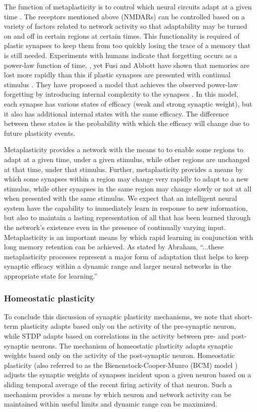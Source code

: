 \documentclass[twocolumn]{article}
\begin{document}
The function of metaplasticity is to control which neural circuits adapt at a given time \cite{ab2008}. The receptors mentioned above (NMDARs) can be controlled based on a variety of factors related to network activity so that adaptability may be turned on and off in certain regions at certain times. This functionality is required of plastic synapses to keep them from too quickly losing the trace of a memory that is still needed. Experiments with humans indicate that forgetting occurs as a power-law function of time, \cite{wieb1991,wieb1997}, yet Fusi and Abbott have shown that memories are lost more rapidly than this if plastic synapses are presented with continual stimulus \cite{fuab2007}. They have proposed a model that achieves the observed power-law forgetting by introducing internal complexity to the synapses \cite{fudr2005}. In this model, each synapse has various states of efficacy (weak and strong synaptic weight), but it also has additional internal states with the same efficacy. The difference between these states is the probability with which the efficacy will change due to future plasticity events. 

Metaplasticity provides a network with the means to to enable some regions to adapt at a given time, under a given stimulus, while other regions are unchanged at that time, under that stimulus. Further, metaplasticity provides a means by which some synapses within a region may change very rapidly to adapt to a new stimulus, while other synapses in the same region may change slowly or not at all when presented with the same stimulus. We expect that an intelligent neural system have the capability to immediately learn in response to new information, but also to maintain a lasting representation of all that has been learned through the network's existence even in the presence of continually varying input. Metaplasticity is an important means by which rapid learning in conjunction with long memory retention can be achieved. As stated by Abraham, ``...these metaplasticity processes represent a major form of adaptation that helps to keep synaptic efficacy within a dynamic range and larger neural networks in the appropriate state for learning.''

\subsubsection{Homeostatic plasticity}
To conclude this discussion of synaptic plasticity mechanisms, we note that short-term plasticity adapts based only on the activity of the pre-synaptic neuron, while STDP adapts based on correlations in the activity between pre- and post-synaptic neurons. The mechanism of homeostatic plasticity \cite{cube2012} adapts synaptic weights based only on the activity of the post-synaptic neuron. Homeostatic plasticity (also referred to as the Bienenstock-Cooper-Munro (BCM) model \cite{bico1982}) adjusts the synaptic weights of synapses incident upon a given neuron based on a sliding temporal average of the recent firing activity of that neuron. Such a mechanism provides a means by which neuron and network activity can be maintained within useful limits and dynamic range can be maximized.
\end{document}

